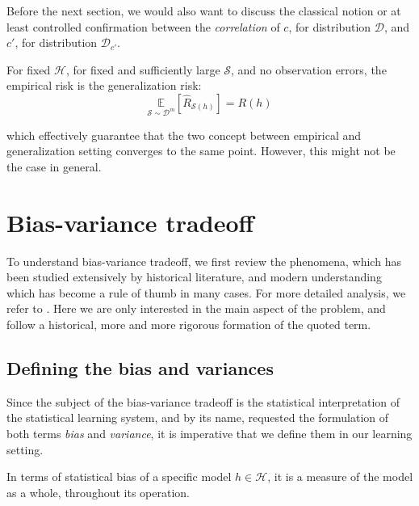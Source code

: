Before the next section, we would also want to discuss the classical notion or at least controlled confirmation between the \textit{correlation} of $c$, for distribution $\mathcal{D}$, and $c'$, for distribution $\mathcal{D}_{c'}$. 

\begin{theorem}
    For fixed $\mathcal{H}$, for fixed and sufficiently large $\mathcal{S}$, and no observation errors, the empirical risk is the generalization risk: 
    \begin{equation}
        \underset{\mathcal{S}\sim \mathcal{D}^{m}}{\mathbb{E}}[\hat{R}_{\mathcal{S}(h)}]  = R(h)
    \end{equation} 
\end{theorem}
which effectively guarantee that the two concept between empirical and generalization setting converges to the same point. However, this might not be the case in general. 
\section{Bias-variance tradeoff}

To understand bias-variance tradeoff, we first review the phenomena, which has been studied extensively by historical literature, and modern understanding which has become a rule of thumb in many cases. For more detailed analysis, we refer to \cite{noauthor_bias-variance_nodate,hellstrom_bias_2020,6797087,Scott_Fortmann_Bias}. Here we are only interested in the main aspect of the problem, and follow a historical, more and more rigorous formation of the quoted term. 

\subsection{Defining the bias and variances}

Since the subject of the bias-variance tradeoff is the statistical interpretation of the statistical learning system, and by its name, requested the formulation of both terms \textit{bias} and \textit{variance}, it is imperative that we define them in our learning setting. 

In terms of statistical bias of a specific model $h\in \mathcal{H}$, it is a measure of the model as a whole, throughout its operation. 


